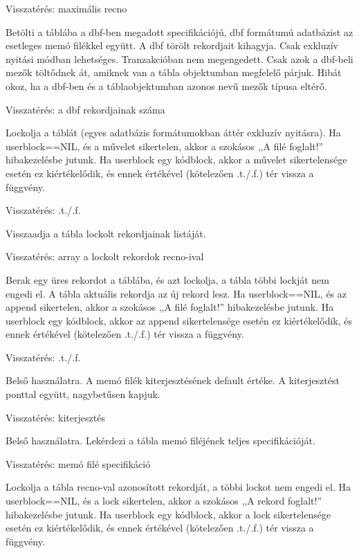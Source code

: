 Visszatérés: maximális recno
 

Betölti a táblába a dbf-ben megadott specifikációjú, dbf formátumú
adatbázist az esetleges memó filékkel együtt. A dbf törölt rekordjait
kihagyja.
Csak exkluzív nyitási módban lehetséges. Tranzakcióban nem megengedett. 
Csak azok a dbf-beli mezők töltődnek át, amiknek van a tábla objektumban 
megfelelő párjuk. Hibát okoz, ha a dbf-ben és a táblaobjektumban azonos 
nevű mezők típusa eltérő.

Visszatérés: a dbf rekordjainak száma


Lockolja a táblát (egyes adatbázis formátumokban áttér exkluzív nyitásra).
Ha userblock==NIL, és a művelet sikertelen, 
akkor a szokásos ,,A filé foglalt!'' hibakezelésbe jutunk.
Ha userblock egy kódblock, akkor a művelet sikertelensége esetén
ez kiértékelődik, és ennek értékével (kötelezően .t./.f.) tér 
vissza a függvény.

Visszatérés: .t./.f.
 

Visszaadja a tábla lockolt rekordjainak listáját.

Visszatérés: array a lockolt rekordok recno-ival


Berak egy üres rekordot a táblába, és azt lockolja, a tábla többi 
lockját nem engedi el. A tábla aktuális rekordja az új rekord lesz.
Ha userblock==NIL, és az append sikertelen, 
akkor a szokásos ,,A filé foglalt!'' hibakezelésbe jutunk.
Ha userblock egy kódblock, akkor az append sikertelensége esetén
ez kiértékelődik, és ennek értékével (kötelezően .t./.f.) tér 
vissza a függvény.

Visszatérés: .t./.f.
 

Belső használatra. 
A memó filék kiterjesztésének default értéke.
A kiterjesztést ponttal együtt, nagybetűsen kapjuk.

Visszatérés: kiterjesztés

 
Belső használatra. 
Lekérdezi a tábla memó filéjének teljes specifikációját.

Visszatérés: memó filé specifikáció


Lockolja a tábla recno-val azonosított rekordját, a többi lockot
nem engedi el. Ha userblock==NIL, és a lock sikertelen, akkor a
szokásos ,,A rekord foglalt!'' hibakezelésbe jutunk.
Ha userblock egy kódblock, akkor a lock sikertelensége esetén
ez kiértékelődik, és ennek értékével (kötelezően .t./.f.) tér 
vissza a függvény.

